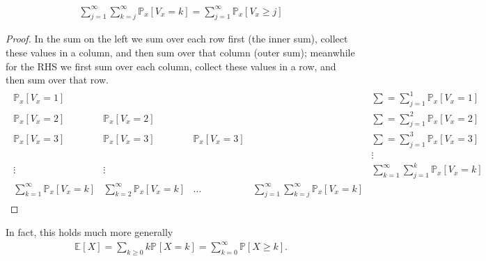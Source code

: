 \begin{lemma}[]
\begin{align}
\sum_{j=1}^{\infty} \sum_{k=j}^{\infty} \mathbb{P}_{x} \left[ V_x = k \right] = \sum_{j=1}^{\infty} \mathbb{P}_{x} \left[ V_x \geq j \right]  	
\end{align}
\end{lemma}
\begin{proof}
	In the sum on the left we sum over each row first (the inner sum), collect these values in a column, and then sum over that column (outer sum); meanwhile for the RHS we first sum over each column, collect these values in a row, and then sum over that row.	
	\begin{align}
	\begin{matrix}
	\mathbb{P}_{x} \left[ V_x = 1 \right] & & & & \sum=\sum_{j=1}^{1} \mathbb{P}_{x} \left[ V_x =1 \right]  \\
	\mathbb{P}_{x} \left[ V_x = 2 \right] & \mathbb{P}_{x} \left[ V_x =2 \right] & & & \sum = \sum_{j=1}^{2} \mathbb{P}_{x} \left[ V_x = 2 \right]  \\
	\mathbb{P}_{x} \left[ V_x = 3 \right] & \mathbb{P}_{x} \left[ V_x =3 \right] &  \mathbb{P}_{x} \left[ V_x=3 \right] & & \sum = \sum_{j=1}^{3} \mathbb{P}_{x} \left[ V_x =3 \right]  \\
	& & & & \vdots \\ 
	\vdots & \vdots & & & \sum_{k=1}^{\infty} \sum_{j=1}^{k} \mathbb{P}_{x} \left[ V_x = k \right] \\
	\sum_{k=1}^{\infty} \mathbb{P}_{x} \left[ V_x =k \right] & \sum_{k=2}^{\infty} \mathbb{P}_{x} \left[ V_x=k \right]  &  \ldots  & \sum_{j=1}^{\infty} \sum_{k=j}^{\infty} \mathbb{P}_{x} \left[ V_x = k \right]  
	\end{matrix}
	\end{align}
\end{proof}

\begin{rmk}[]
	In fact, this holds much more generally
\begin{align}
	\mathbb{E}_{} \left[ X \right] = \sum_{k\geq 0}^{} k \mathbb{P}_{} \left[ X=k \right] = \sum_{k=0}^{\infty} \mathbb{P} \left[X \geq k  \right] 
.\end{align}
\end{rmk}

